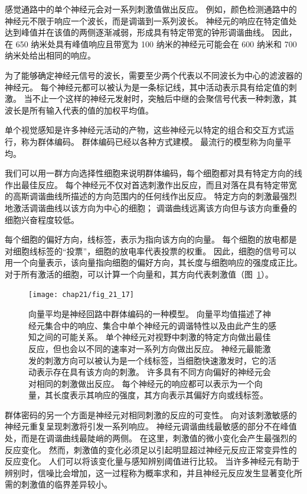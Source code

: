 感觉通路中的单个神经元会对一系列刺激值做出反应。
例如，颜色检测通路中的神经元不限于响应一个波长，而是调谐到一系列波长。 
神经元的响应在特定值处达到峰值并在该值的两侧逐渐减弱，形成具有特定带宽的钟形调谐曲线。
因此，在 650 纳米处具有峰值响应且带宽为 100 纳米的神经元可能会在 600 纳米和 700 纳米处给出相同的响应。


为了能够确定神经元信号的波长，需要至少两个代表以不同波长为中心的滤波器的神经元。 
每个神经元都可以被认为是一条标记线，其中活动表示具有给定值的刺激。 
当不止一个这样的神经元发射时，突触后中继的会聚信号代表一种刺激，其波长是所有输入代表的值的加权平均值。


单个视觉感知是许多神经元活动的产物，这些神经元以特定的组合和交互方式运行，称为群体编码。 
群体编码已经以各种方式建模。 
最流行的模型称为向量平均。


我们可以用一群方向选择性细胞来说明群体编码，每个细胞都对具有特定方向的线作出最佳反应。 
每个神经元不仅对首选刺激作出反应，而且对落在具有特定带宽的高斯调谐曲线所描述的方向范围内的任何线作出反应。 
特定方向的刺激最强烈地激活调谐曲线以该方向为中心的细胞； 
调谐曲线远离该方向但与该方向重叠的细胞兴奋程度较低。


每个细胞的偏好方向，线标签，表示为指向该方向的向量。
每个细胞的放电都是对细胞线标签的“投票”，细胞的放电率代表投票的权重。
因此，细胞的信号可以用一个向量表示，该向量指向细胞的偏好方向，其长度与细胞响应的强度成正比。
对于所有激活的细胞，可以计算一个向量和，其方向代表刺激值（图~\ref{fig:21_17}）。


\begin{figure}[htbp]
	\centering
	\texttt{[image: chap21/fig\_21\_17]}
	\caption{向量平均是神经回路中群体编码的一种模型。
		向量平均值描述了神经元集合中的响应、集合中单个神经元的调谐特性以及由此产生的感知之间的可能关系。
		单个神经元对视野中刺激的特定方向做出最佳反应，但也会以不同的速率对一系列方向做出反应。
		神经元最能激发的刺激方向可以被认为是一个线标签，当细胞快速激发时，它的活动表示存在具有该方向的刺激。
		许多具有不同方向偏好的神经元会对相同的刺激做出反应。
		每个神经元的响应都可以表示为一个向量，其长度表示其响应的强度，其方向表示其偏好方向或线标签\cite{kapadia2000spatial}。}
	\label{fig:21_17}
\end{figure}


群体密码的另一个方面是神经元对相同刺激的反应的可变性。
向对该刺激敏感的神经元重复呈现刺激将引发一系列响应。
神经元调谐曲线最敏感的部分不在峰值处，而是在调谐曲线最陡峭的两侧。
在这里，刺激值的微小变化会产生最强烈的反应变化。
然而，刺激值的变化必须足以引起明显超过神经元反应正常变异性的反应变化。
人们可以将该变化量与感知辨别阈值进行比较。
当许多神经元有助于辨别时，信噪比会增加，这一过程称为概率求和，并且神经元反应发生显著变化所需的刺激值的临界差异较小。


